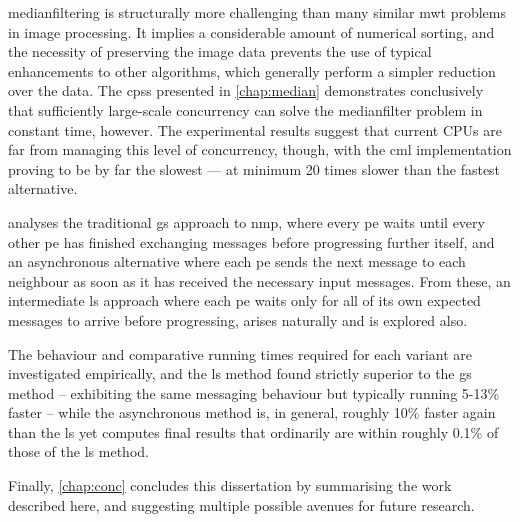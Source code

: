 \Gls{medianfilter}ing is structurally more challenging than many similar \gls{mwt} problems in image processing.  It implies a considerable amount of numerical sorting, and the necessity of preserving the image data prevents the use of typical enhancements to other algorithms, which generally perform a simpler reduction over the data.  The \glspl{cps} presented in \cref{chap:median} demonstrates conclusively that sufficiently large-scale concurrency can solve the \gls{medianfilter} problem in constant time, however.  The experimental results suggest that current CPUs are far from managing this level of concurrency, though, with the \gls{cml} implementation proving to be by far the slowest --- at minimum 20 times slower than the fastest alternative.

 analyses the traditional \gls{gs} approach to \gls{nmp}, where every \gls{pe} waits until every other \gls{pe} has finished exchanging messages before progressing further itself, and an asynchronous alternative where each \gls{pe} sends the next message to each neighbour as soon as it has received the necessary input messages.  From these, an intermediate \gls{ls} approach where each \gls{pe} waits only for all of its own expected messages to arrive before progressing, arises naturally and is explored also.

The behaviour and comparative running times required for each variant are investigated empirically, and the \gls{ls} method found strictly superior to the \gls{gs} method -- exhibiting the same messaging behaviour but typically running 5-13\% faster -- while the asynchronous method is, in general, roughly 10\% faster again than the \gls{ls} yet computes final results that ordinarily are within roughly 0.1\% of those of the \gls{ls} method.

Finally, \cref{chap:conc} concludes this dissertation by summarising the work described here, and suggesting multiple possible avenues for future research.